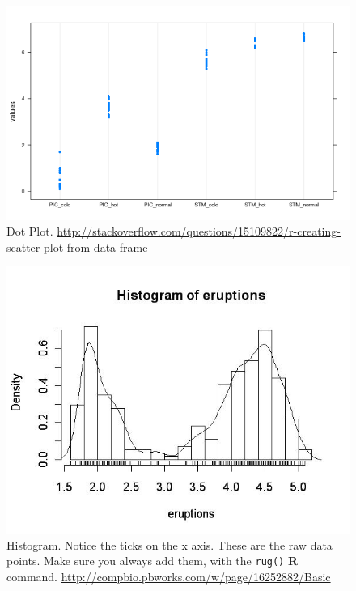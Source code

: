 \documentclass[12pt,a4paper]{report}
\theoremstyle{plain}
\theoremstyle{definition}
\newcommand{\R}{\textnormal{\sffamily\bfseries R }}
\newcommand{\rcode}[1]{\texttt{#1}}
\begin{document}
 
\begin{figure}[h]
\centering
\includegraphics[height=0.3\textheight]{art/lmCm0}
\caption[Dot Plot]{Dot Plot. \newline \url{http://stackoverflow.com/questions/15109822/r-creating-scatter-plot-from-data-frame}}
\label{fig:dot_plot}
\end{figure}



\begin{figure}[h]
\centering
\includegraphics[height=0.3\textheight]{art/histogram_eruptions}
\caption[Histogram]{Histogram. 
Notice the ticks on the x axis. These are the raw data points. Make sure you always add them, with the \rcode{rug()} \R command. 
\newline \url{http://compbio.pbworks.com/w/page/16252882/Basic}}
\label{fig:histogram_eruptions}
\end{figure}
\end{document}

